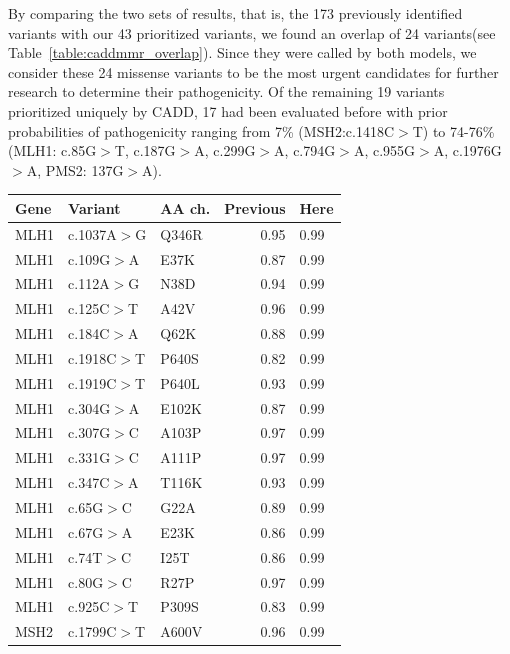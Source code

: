 By comparing the two sets of results, that is, the 173 previously identified variants with our 43 prioritized variants, we found an overlap of 24 variants(see Table~\ref{table:caddmmr_overlap}).
Since they were called by both models, we consider these 24 missense variants to be the most urgent candidates for further research to determine their pathogenicity.
Of the remaining 19 variants prioritized uniquely by CADD, 17 had been evaluated before with prior probabilities of pathogenicity ranging from 7\% (MSH2:c.1418C$>$T) to 74-76\% (MLH1: c.85G$>$T, c.187G$>$A, c.299G$>$A, c.794G$>$A, c.955G$>$A, c.1976G$>$A, PMS2: 137G$>$A).

\begin{table}[h]
\begin{tabular}{ l l l r l }
  Gene & Variant & AA ch. & Previous\cite{Thompson_2013b} & Here\\
  \hline
  \rule{0pt}{2.5ex}MLH1 & c.1037A$>$G & Q346R & 0.95 & 0.99 \\
  \rule{0pt}{2.5ex}MLH1 & c.109G$>$A & E37K & 0.87 & 0.99 \\
  \rule{0pt}{2.5ex}MLH1 & c.112A$>$G & N38D & 0.94 & 0.99 \\
  \rule{0pt}{2.5ex}MLH1 & c.125C$>$T & A42V & 0.96 & 0.99 \\
  \rule{0pt}{2.5ex}MLH1 & c.184C$>$A & Q62K & 0.88 & 0.99 \\
  \rule{0pt}{2.5ex}MLH1 & c.1918C$>$T & P640S & 0.82 & 0.99 \\
  \rule{0pt}{2.5ex}MLH1 & c.1919C$>$T & P640L & 0.93 & 0.99 \\
  \rule{0pt}{2.5ex}MLH1 & c.304G$>$A & E102K & 0.87 & 0.99 \\
  \rule{0pt}{2.5ex}MLH1 & c.307G$>$C & A103P & 0.97 & 0.99 \\
  \rule{0pt}{2.5ex}MLH1 & c.331G$>$C & A111P & 0.97 & 0.99 \\
  \rule{0pt}{2.5ex}MLH1 & c.347C$>$A & T116K & 0.93 & 0.99 \\
  \rule{0pt}{2.5ex}MLH1 & c.65G$>$C & G22A & 0.89 & 0.99 \\
  \rule{0pt}{2.5ex}MLH1 & c.67G$>$A & E23K & 0.86 & 0.99 \\
  \rule{0pt}{2.5ex}MLH1 & c.74T$>$C & I25T & 0.86 & 0.99 \\
  \rule{0pt}{2.5ex}MLH1 & c.80G$>$C & R27P & 0.97 & 0.99 \\
  \rule{0pt}{2.5ex}MLH1 & c.925C$>$T & P309S & 0.83 & 0.99 \\
  \rule{0pt}{2.5ex}MSH2 & c.1799C$>$T & A600V & 0.96 & 0.99 \\

\end{tabular}
\end{table}
